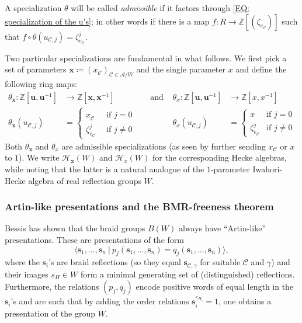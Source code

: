 \documentclass[ALCO, Unicode]{cedram}
\newcommand{\ZZ}{\mathbb{Z}}
\begin{document}
\begin{defi}\label{Defn: admissible specializations} A specialization $\theta$ will be called \emph{\color{blue} admissible} if it factors through \eqref{EQ: specialization of the u's}; in other words if there is a map $f:R\rightarrow \ZZ[(\zeta_{e_{\mathcal{C}}})]$ such that $f\circ\theta(u_{\mathcal{C},j})=\zeta_{e_{\mathcal{C}}}^j$. 
\end{defi}

Two particular specializations are fundamental in what follows. We first pick a set of parameters $\bm x\coloneqq (x_{\mathcal{C}})_{\mathcal{C}\in\mathcal{A}/W}$ and the single parameter $x$ and define the following ring maps:\begin{align}
\theta_{\bm x}:\ZZ[\bm u,\bm u^{-1}]&\rightarrow \ZZ[\bm x,\bm x^{-1}] \quad\quad \quad\quad\text{ and }& \theta_x:\ZZ[\bm u,\bm u^{-1}]&\rightarrow \ZZ[x,x^{-1}]\nonumber\\
\theta_{\bm x}(u_{\mathcal{C},j})&=\begin{cases} x^{\phantom{N_W}}_{\mathcal{C}}&\text{if }j=0\\ \zeta_{e_{\mathcal{C}}}^j&\text{if }j\neq 0\end{cases}  &\theta_x(u_{\mathcal{C},j})&=\begin{cases} x&\text{if }j=0\\ \zeta_{e_{\mathcal{C}}}^j&\text{if }j\neq 0\end{cases} \label{EQ: admissible specializations}
\end{align}
Both $\theta_{\bm x}$ and $\theta_x$ are admissible specializations (as seen by further sending $x_{\mathcal{C}}$ or $x$ to $1$). We write $\mathcal{H}_{\bm x}(W)$ and $\mathcal{H}_x(W)$ for the corresponding Hecke algebras, while noting that the latter is a natural analogue of the $1$-parameter Iwahori-Hecke algebra of real reflection groups $W$.

\subsubsection*{Artin-like presentations and the BMR-freeness theorem}

Bessis \cite{bes-zariski} has shown that the braid groups $B(W)$ always have ``Artin-like'' presentations. These are presentations of the form $$\langle \bm s_1,\ldots, \bm s_n\ |\ p_j(\bm s_1,\ldots, \bm s_n)= q_j(\bm s_1,\ldots, \bm s_n)\rangle,$$ where the $\bm s_i$'s are braid reflections (so they equal $\bm s_{\mathcal{C},\gamma}$ for suitable $\mathcal{C}$ and $\gamma$) and their images $s_H \in W$ form a minimal generating set of (distinguished) reflections. Furthermore, the relations $(p_j,q_j)$ encode positive words of equal length in the $\bm s_i$'s and are such that by adding the order relations $\bm s_i^{e_{H_i}}=1$, one obtains a presentation of the group $W$.
\end{document}
